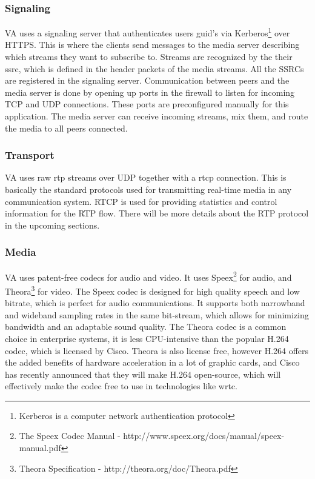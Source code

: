\subsubsection{Signaling}
VA uses a signaling server that authenticates users \gls{guid}'s via Kerberos\footnote{Kerberos is a computer network authentication protocol} over HTTPS. This is where the clients send messages to the media server describing which streams they want to subscribe to. Streams are recognized by the their \gls{ssrc}, which is defined in the header packets of the media streams. All the SSRCs are registered in the signaling server. Communication between peers and the media server is done by opening up ports in the firewall to listen for incoming TCP and UDP connections. These ports are preconfigured manually for this application. The media server can receive incoming streams, mix them, and route the media to all peers connected.

\subsubsection{Transport}
VA uses raw \gls{rtp} streams over UDP together with a \gls{rtcp} connection. This is basically the standard protocols used for transmitting real-time media in any communication system. RTCP is used for providing statistics and control information for the RTP flow. There will be more details about the RTP protocol in the upcoming sections.

\subsubsection{Media}
VA uses patent-free codecs for audio and video. It uses Speex\footnote{The Speex Codec Manual - http://www.speex.org/docs/manual/speex-manual.pdf} for audio, and Theora\footnote{Theora Specification - http://theora.org/doc/Theora.pdf} for video. The Speex codec is designed for high quality speech and low bitrate, which is perfect for audio communications. It supports both narrowband and wideband sampling rates in the same bit-stream\cite{speex}, which allows for minimizing bandwidth and an adaptable sound quality. The Theora codec is a common choice in enterprise systems, it is less CPU-intensive than the popular H.264 codec\cite{theora}, which is licensed by Cisco. Theora is also license free, however H.264 offers the added benefits of hardware acceleration in a lot of graphic cards, and Cisco has recently announced that they will make H.264 open-source\cite{h264-free}, which will effectively make the codec free to use in technologies like \gls{wrtc}.

